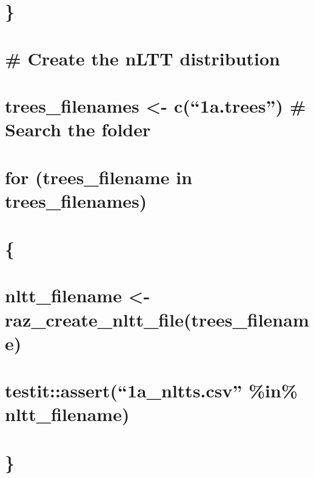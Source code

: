 \documentclass[]{article}
\begin{document}
\section{\}}\label{section-4}

\section{}\label{section-5}

\section{\# Create the nLTT
distribution}\label{create-the-nltt-distribution}

\section{\texorpdfstring{trees\_filenames \textless{}- c(``1a.trees'')
\# Search the
folder}{trees\_filenames \textless{}- c(1a.trees) \# Search the folder}}\label{trees_filenames---c1a.trees-search-the-folder}

\section{for (trees\_filename in
trees\_filenames)}\label{for-trees_filename-in-trees_filenames}

\section{\{}\label{section-6}

\section{nltt\_filename \textless{}-
raz\_create\_nltt\_file(trees\_filename)}\label{nltt_filename---raz_create_nltt_filetrees_filename}

\section{\texorpdfstring{testit::assert(``1a\_nltts.csv'' \%in\%
nltt\_filename)}{testit::assert(1a\_nltts.csv \%in\% nltt\_filename)}}\label{testitassert1a_nltts.csv-in-nltt_filename}

\section{\}}\label{section-7}
\end{document}
